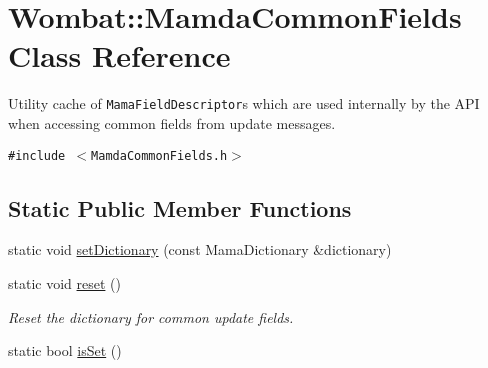 \hypertarget{classWombat_1_1MamdaCommonFields}{
\section{Wombat::Mamda\-Common\-Fields Class Reference}
\label{classWombat_1_1MamdaCommonFields}
}
Utility cache of {\tt Mama\-Field\-Descriptor}s which are used internally by the API when accessing common fields from update messages.  


{\tt \#include $<$Mamda\-Common\-Fields.h$>$}

\subsection*{Static Public Member Functions}
\begin{CompactItemize}
\item 
static void \hyperlink{classWombat_1_1MamdaCommonFields_116796372a323981128e37e1280d1687}{set\-Dictionary} (const Mama\-Dictionary \&dictionary)
\item 
static void \hyperlink{classWombat_1_1MamdaCommonFields_264321093ccccc6f9ed3277aedc28786}{reset} ()
\begin{CompactList}\small\item\em Reset the dictionary for common update fields. \item\end{CompactList}\item 
static bool \hyperlink{classWombat_1_1MamdaCommonFields_5b249556636a799085934d95baf141ee}{is\-Set} ()
\end{CompactItemize}
